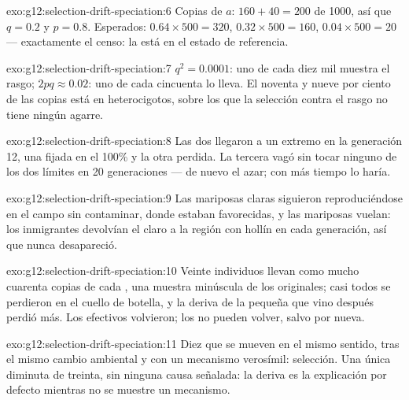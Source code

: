 \begin{solution}{exo:g12:selection-drift-speciation:6}
Copias de $a$: $160 + 40 = 200$ de 1000, así que $q = 0.2$ y $p = 0.8$.
Esperados: $0.64 \times 500 = 320$, $0.32 \times 500 = 160$, $0.04
\times 500 = 20$ --- exactamente el censo: la  está en el
estado de referencia.
\end{solution}

\begin{solution}{exo:g12:selection-drift-speciation:7}
$q^2 = 0.0001$: uno de cada diez mil muestra el rasgo; $2pq \approx
0.02$: uno de cada cincuenta lo lleva. El noventa y nueve por ciento de
las copias está en heterocigotos, sobre los que la selección contra el
rasgo no tiene ningún agarre.
\end{solution}

\begin{solution}{exo:g12:selection-drift-speciation:8}
Las dos llegaron a un extremo en la generación 12, una fijada en el
100\% y la otra perdida. La tercera vagó sin tocar ninguno de los dos
límites en 20 generaciones --- de nuevo el azar; con más tiempo lo
haría.
\end{solution}

\begin{solution}{exo:g12:selection-drift-speciation:9}
Las mariposas claras siguieron reproduciéndose en el campo sin
contaminar, donde estaban favorecidas, y las mariposas vuelan: los
inmigrantes devolvían el  claro a la región con hollín en cada
generación, así que nunca desapareció.
\end{solution}

\begin{solution}{exo:g12:selection-drift-speciation:10}
Veinte individuos llevan como mucho cuarenta copias de cada , una
muestra minúscula de los  originales; casi todos se perdieron en
el cuello de botella, y la deriva de la  pequeña que vino
después perdió más. Los efectivos volvieron; los  no pueden
volver, salvo por  nueva.
\end{solution}

\begin{solution}{exo:g12:selection-drift-speciation:11}
Diez  que se mueven en el mismo sentido, tras el mismo
cambio ambiental y con un mecanismo verosímil: selección. Una única
 diminuta de treinta, sin ninguna causa señalada: la deriva es
la explicación por defecto mientras no se muestre un mecanismo.
\end{solution}

